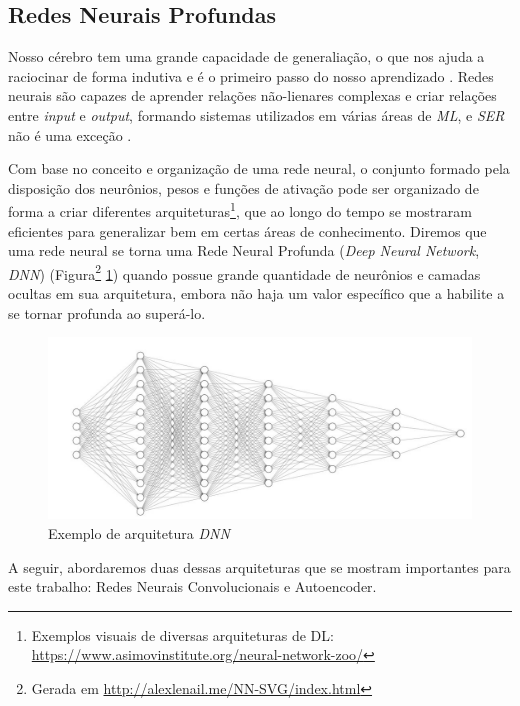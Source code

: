 \subsection{Redes Neurais Profundas}

Nosso cérebro tem uma grande capacidade de generaliação, o que nos ajuda a raciocinar de forma indutiva e é o primeiro passo do nosso aprendizado \cite{32}. Redes neurais são capazes de aprender relações não-lienares complexas e criar relações entre \textit{input} e \textit{output}, formando sistemas utilizados em várias áreas de \textit{ML}, e \textit{SER} não é uma exceção \cite{32.74}.

Com base no conceito e organização de uma rede neural, o conjunto formado pela disposição dos neurônios, pesos e funções de ativação pode ser organizado de forma a criar diferentes arquiteturas\footnote{Exemplos visuais de diversas arquiteturas de DL: \url{https://www.asimovinstitute.org/neural-network-zoo/}}, que ao longo do tempo se mostraram eficientes para generalizar bem em certas áreas de conhecimento. Diremos que uma rede neural se torna uma Rede Neural Profunda (\textit{Deep Neural Network}, \textit{DNN}) (Figura\footnote{Gerada em \url{http://alexlenail.me/NN-SVG/index.html}} \ref{fig:exarqdnn}) quando possue grande quantidade de neurônios e camadas ocultas em sua arquitetura, embora não haja um valor específico que a habilite a se tornar profunda ao superá-lo.

\begin{figure}[!h]
\centering
\includegraphics[width=1.0\textwidth]{imagens/ex-dnn.JPG}
\caption{\label{fig:exarqdnn}Exemplo de arquitetura \textit{DNN}}
\end{figure}

A seguir, abordaremos duas dessas arquiteturas que se mostram importantes para este trabalho: Redes Neurais Convolucionais e Autoencoder.

